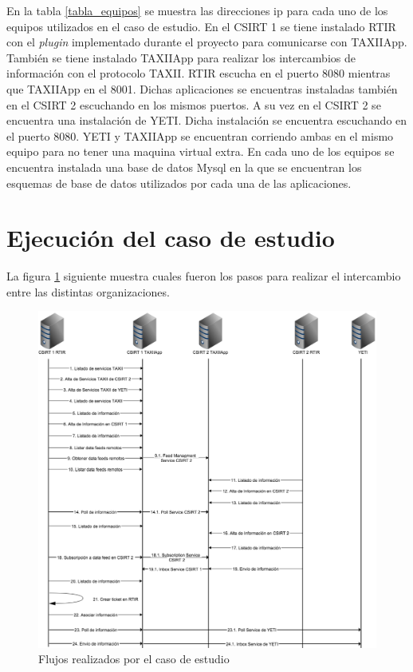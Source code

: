 En la tabla \ref{tabla_equipos} se muestra las direcciones ip para cada uno de los equipos utilizados en el caso de estudio. En el CSIRT 1 se tiene instalado RTIR con el \textit{plugin} implementado durante el proyecto para comunicarse con TAXIIApp. También se tiene instalado TAXIIApp para realizar los intercambios de información con el protocolo TAXII. RTIR escucha en el puerto 8080 mientras que TAXIIApp en el 8001.
Dichas aplicaciones se encuentras instaladas también en el CSIRT 2 escuchando en los mismos puertos. A su vez en el CSIRT 2 se encuentra una instalación de YETI. Dicha instalación se encuentra escuchando en el puerto 8080. YETI y TAXIIApp se encuentran corriendo ambas en el mismo equipo para no tener una maquina virtual extra.
En cada uno de los equipos se encuentra instalada una base de datos Mysql en la que se encuentran los esquemas de base de datos utilizados por cada una de las aplicaciones.

\section{Ejecución del caso de estudio}
La figura \ref{fig.flujos} siguiente muestra cuales fueron los pasos para realizar el intercambio entre las distintas organizaciones.

\begin{figure}[h!]
	\centering
	\includegraphics[scale=0.35]{caso-de-estudio/flujos.png}
	\caption{Flujos realizados por el caso de estudio}
	\label{fig.flujos}
\end{figure}

